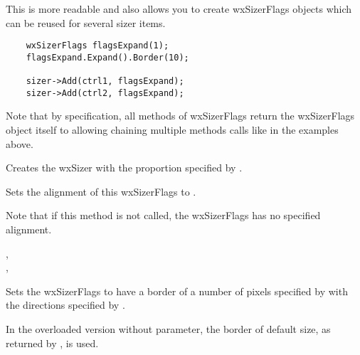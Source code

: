 This is more readable and also allows you to create wxSizerFlags objects which
can be reused for several sizer items.
\begin{verbatim}
    wxSizerFlags flagsExpand(1);
    flagsExpand.Expand().Border(10);

    sizer->Add(ctrl1, flagsExpand);
    sizer->Add(ctrl2, flagsExpand);
\end{verbatim}

Note that by specification, all methods of wxSizerFlags return the wxSizerFlags
object itself to allowing chaining multiple methods calls like in the examples
above.


\label{wxsizerflagsctor}


Creates the wxSizer with the proportion specified by .


\label{wxsizerflagsalign}


Sets the alignment of this wxSizerFlags to .

Note that if this method is not called, the wxSizerFlags has no specified alignment.


,\\
,\\


\label{wxsizerflagsborder}



Sets the wxSizerFlags to have a border of a number of pixels specified by
 with the directions specified by .

In the overloaded version without  parameter, the border of
default size, as returned by ,
is used.


\label{wxsizerflagscenter}


